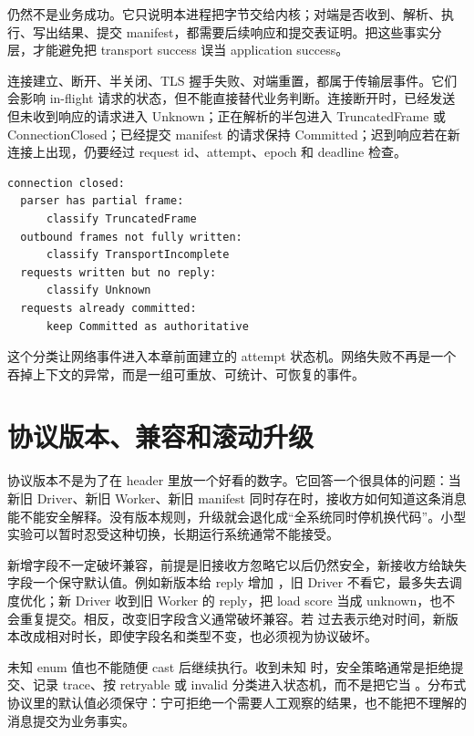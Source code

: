  仍然不是业务成功。它只说明本进程把字节交给内核；对端是否收到、解析、执行、写出结果、提交 manifest，都需要后续响应和提交表证明。把这些事实分层，才能避免把 transport success 误当 application success。

连接建立、断开、半关闭、TLS 握手失败、对端重置，都属于传输层事件。它们会影响 in-flight 请求的状态，但不能直接替代业务判断。连接断开时，已经发送但未收到响应的请求进入 Unknown；正在解析的半包进入 TruncatedFrame 或 ConnectionClosed；已经提交 manifest 的请求保持 Committed；迟到响应若在新连接上出现，仍要经过 request id、attempt、epoch 和 deadline 检查。

\begin{lstlisting}[numbers=none,caption={连接关闭时的分类顺序}]
connection closed:
  parser has partial frame:
      classify TruncatedFrame
  outbound frames not fully written:
      classify TransportIncomplete
  requests written but no reply:
      classify Unknown
  requests already committed:
      keep Committed as authoritative
\end{lstlisting}

这个分类让网络事件进入本章前面建立的 attempt 状态机。网络失败不再是一个吞掉上下文的异常，而是一组可重放、可统计、可恢复的事件。

\section{协议版本、兼容和滚动升级}

协议版本不是为了在 header 里放一个好看的数字。它回答一个很具体的问题：当新旧 Driver、新旧 Worker、新旧 manifest 同时存在时，接收方如何知道这条消息能不能安全解释。没有版本规则，升级就会退化成“全系统同时停机换代码”。小型实验可以暂时忍受这种切换，长期运行系统通常不能接受。

新增字段不一定破坏兼容，前提是旧接收方忽略它以后仍然安全，新接收方给缺失字段一个保守默认值。例如新版本给 reply 增加 ，旧 Driver 不看它，最多失去调度优化；新 Driver 收到旧 Worker 的 reply，把 load score 当成 unknown，也不会重复提交。相反，改变旧字段含义通常破坏兼容。若  过去表示绝对时间，新版本改成相对时长，即使字段名和类型不变，也必须视为协议破坏。

未知 enum 值也不能随便 cast 后继续执行。收到未知  时，安全策略通常是拒绝提交、记录 trace、按 retryable 或 invalid 分类进入状态机，而不是把它当 。分布式协议里的默认值必须保守：宁可拒绝一个需要人工观察的结果，也不能把不理解的消息提交为业务事实。

